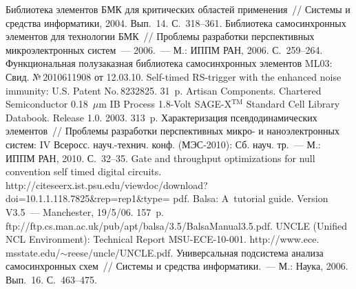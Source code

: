 \begin{multicols}{2}
{{\begin{thebibliography}{99}
 Библиотека элементов БМК для критических 
областей применения~// Системы и средства информатики, 2004. 
Вып.~14. С.~318--361.
 Библиотека 
самосинхронных элементов для технологии БМК~// Проблемы разработки 
перспективных микроэлектронных систем~--- 2006.~--- М.: ИППМ РАН, 2006. 
С.~259--264.
Функциональная полузаказная биб\-ли\-о\-тека самосинхронных элементов ML03: Свид. 
№\,2010611908 от 12.03.10.
 Self-timed RS-trigger with the 
enhanced noise immunity: U.S. Patent No.\,8232825. 31~p.
Artisan Components. Chartered Semiconductor 0.18~$\mu$m IB Process 1.8-Volt 
SAGE-X$^{\mathrm{TM}}$ Standard Cell Library Databook. Release 1.0. 2003. 313~p.
 Характеризация 
псевдодинамических элементов~// Проблемы разработки перспективных микро- и 
наноэлектронных систем: IV Всеросс. науч.-технич. конф. (МЭС-2010): Сб. 
науч. тр.~--- М.: ИППМ РАН, 2010. С.~32--35.
Gate and throughput optimizations for null convention self timed digital circuits. {\sf 
http://citeseerx.ist.psu.edu/\linebreak viewdoc/download?doi=10.1.1.118.7825\&rep=rep1\&\linebreak type= pdf}.
 Balsa: A~tutorial guide. Version 
V3.5~--- Manchester, 19/5/06. 157~p. 
{\sf ftp://ftp.cs.man.ac.uk/pub/apt/\linebreak balsa/3.5/BalsaManual3.5.pdf}.
 UNCLE (Unified NCL Environment): Technical Report MSU-ECE-10-001. {\sf 
http://www.ece. msstate.edu/$\sim$reese/uncle/UNCLE.pdf}.
Универсальная подсистема анализа самосинхронных схем~// Системы и средства 
информатики.~--- М.: Наука, 2006. Вып.~16. С.~463--475.

\end{thebibliography}
} }

\end{multicols}

\vspace*{-6pt}


